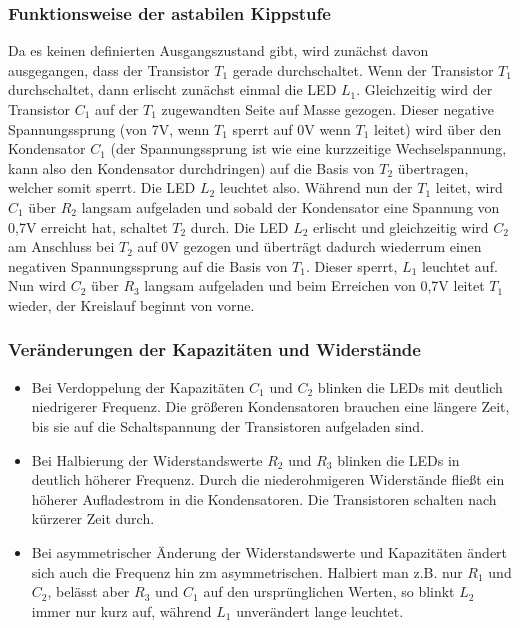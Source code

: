\documentclass[
a4paper,     %
 headsepline, %
11pt         %
]{scrartcl}  %
\begin{document}
\subsubsection{Funktionsweise der astabilen Kippstufe}
Da es keinen definierten Ausgangszustand gibt, wird zunächst davon ausgegangen, dass der Transistor $T_1$ gerade durchschaltet.
Wenn der Transistor $T_1$ durchschaltet, dann erlischt zunächst einmal die LED $L_1$. Gleichzeitig wird der Transistor $C_1$ auf der $T_1$ zugewandten Seite auf Masse gezogen. Dieser negative Spannungssprung (von 7V, wenn $T_1$ sperrt auf 0V wenn $T_1$ leitet) wird über den Kondensator $C_1$ (der Spannungssprung ist wie eine kurzzeitige Wechselspannung, kann also den Kondensator durchdringen) auf die Basis von $T_2$ übertragen, welcher somit sperrt. Die LED $L_2$ leuchtet also. Während nun der $T_1$ leitet, wird $C_1$ über $R_2$ langsam aufgeladen und sobald der Kondensator eine Spannung von 0,7V erreicht hat, schaltet $T_2$ durch. Die LED $L_2$ erlischt und gleichzeitig wird $C_2$ am Anschluss bei $T_2$ auf 0V gezogen und überträgt dadurch wiederrum einen negativen Spannungssprung auf die Basis von $T_1$. Dieser sperrt, $L_1$ leuchtet auf. Nun wird $C_2$ über $R_3$ langsam aufgeladen und beim Erreichen von 0,7V leitet $T_1$ wieder, der Kreislauf beginnt von vorne.
\subsubsection{Veränderungen der Kapazitäten und Widerstände}
\begin{itemize}
\item Bei Verdoppelung der Kapazitäten $C_1$ und $C_2$ blinken die LEDs mit deutlich niedrigerer Frequenz. Die größeren Kondensatoren brauchen eine längere Zeit, bis sie auf die Schaltspannung der Transistoren aufgeladen sind.
\item Bei Halbierung der Widerstandswerte $R_2$ und $R_3$ blinken die LEDs in deutlich höherer Frequenz. Durch die niederohmigeren Widerstände fließt ein höherer Aufladestrom in die Kondensatoren. Die Transistoren schalten nach kürzerer Zeit durch.
\item Bei asymmetrischer Änderung der Widerstandswerte und Kapazitäten ändert sich auch die Frequenz hin zm asymmetrischen. Halbiert man z.B. nur $R_1$ und $C_2$, belässt aber $R_3$ und $C_1$ auf den ursprünglichen Werten, so blinkt $L_2$ immer nur kurz auf, während $L_1$ unverändert lange leuchtet.
\end{itemize}



% 

% 
\end{document}
